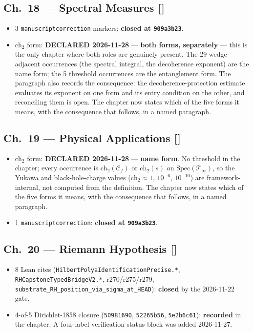 \subsection*{Ch.~18 --- Spectral Measures \hfill [\checkmark]}
\begin{itemize}
\item 3 \texttt{manuscriptcorrection} markers: \textbf{closed at
\texttt{909a3b23}}.
\item $\mathrm{ch}_2$ form: \textbf{DECLARED 2026-11-28} --- \textbf{both forms, separately} --- this is the only chapter where both roles are genuinely present. The 29 wedge-adjacent occurrences (the spectral integral, the decoherence exponent) are the name form; the 5 threshold occurrences are the entanglement form. The paragraph also records the consequence: the decoherence-protection estimate evaluates its exponent on one form and its entry condition on the other, and reconciling them is open. The chapter now states which of the five forms it means, with the consequence that follows, in a named paragraph.
\end{itemize}

\subsection*{Ch.~19 --- Physical Applications \hfill [\checkmark]}
\begin{itemize}
\item $\mathrm{ch}_2$ form: \textbf{DECLARED 2026-11-28} --- \textbf{name form}. No threshold in the chapter; every occurrence is $\mathrm{ch}_2(\mathcal{C}_f)$ or $\mathrm{ch}_2(s)$ on $\mathrm{Spec}(\mathcal{T}_\infty)$, so the Yukawa and black-hole-charge values ($\mathrm{ch}_2 \approx 1$, $10^{-6}$, $10^{-10}$) are framework-internal, not computed from the definition. The chapter now states which of the five forms it means, with the consequence that follows, in a named paragraph.
\item 1 \texttt{manuscriptcorrection}: \textbf{closed at \texttt{909a3b23}}.
\end{itemize}

\subsection*{Ch.~20 --- Riemann Hypothesis \hfill [\checkmark]}
\begin{itemize}
\item 8 Lean cites (\texttt{HilbertPolyaIdentificationPrecise.*},
\texttt{RHCapstoneTypedBridgeV2.*}, r270/r275/r279,
\texttt{substrate\_RH\_position\_via\_sigma\_at\_HEAD}): \textbf{closed} by the
2026-11-22 gate.
\item 4-of-5 Dirichlet-1858 closure (\texttt{50981690}, \texttt{52265b56},
\texttt{5e2b6c61}): \textbf{recorded} in the chapter. A four-label
verification-status block was added 2026-11-27.
\end{itemize}

